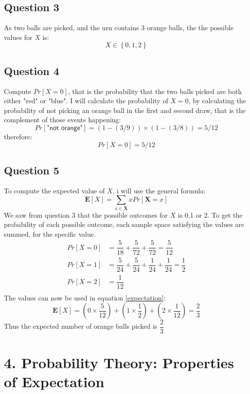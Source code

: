 \documentclass{article}
\begin{document}
\subsection{Question 3}
As two balls are picked, and the urn contains 3 orange balls, the the possible values for $X$ is:
$$ X \in \left\lbrace 0,1,2 \right\rbrace $$
\subsection{Question 4}
Compute $Pr[X = 0]$, that is the probability that the two balls picked are both either "red" or "blue". I will calculate the probability of $X = 0$, by calculating the probability of not picking an orange ball in the first and second draw, that is the complement of those events happening:
$$ Pr[\textsf{"not orange"}] = \left(1-(3/9)\right) \times \left(1-(3/8)\right) = 5/12 $$
therefore:
$$ Pr[X=0] = 5/12 $$
\subsection{Question 5}
To compute the expected value of $X$, i will use the general formula:
\begin{equation}
\mathbf{E}[X] = \sum\limits_{x \in \mathbf{X}} x  Pr[\mathbf{X} = x]
\label{expectation}
\end{equation}
We saw from question 3 that the possible outcomes for $X$ is 0,1 or 2. To get the probability of each possible outcome, each sample space satisfying the values are summed, for the specific value.
\begin{align*}
Pr[X=0] &= \dfrac{5}{18} + \dfrac{5}{72} + \dfrac{5}{72} = \dfrac{5}{12} \\
Pr[X=1] &= \dfrac{5}{24} + \dfrac{5}{24} + \dfrac{1}{24} + \dfrac{1}{24} = \dfrac{1}{2} \\
Pr[X=2] &= \dfrac{1}{12} \\
\end{align*}
The values can now be used in equation \eqref{expectation}:
$$
\mathbf{E}[X] = (0 \times \dfrac{5}{12}) + (1 \times \dfrac{1}{2}) + (2 \times \dfrac{1}{12}) = \dfrac{2}{3}
$$
Thus the expected number of orange balls picked is $ \dfrac{2}{3}$
\section{4. Probability Theory: Properties of Expectation }
\end{document}
